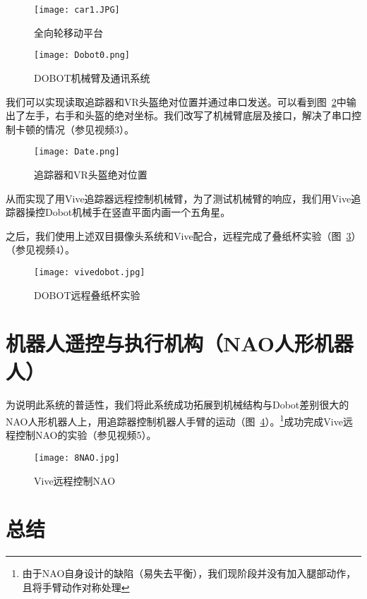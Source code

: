 \begin{figure}
\begin{minipage}{0.48\textwidth}
  \centering
  \texttt{[image: car1.JPG]}
  \caption{全向轮移动平台}
  \label{car1}
\end{minipage}
\begin{minipage}{0.48\textwidth}
  \centering
\texttt{[image: Dobot0.png]}
\caption{DOBOT机械臂及通讯系统} 
\label{sys}
\end{minipage}\hfill
\end{figure}


我们可以实现读取追踪器和VR头盔绝对位置并通过串口发送。可以看到图~\ref{POS}中输出了左手，右手和头盔的绝对坐标。我们改写了机械臂底层及接口，解决了串口控制卡顿的情况{\kaishu （参见视频3）}。

\begin{figure}[htbp]
\small
\centering
\texttt{[image: Date.png]}
\caption{追踪器和VR头盔绝对位置} 
\label{POS}
\end{figure}

从而实现了用Vive追踪器远程控制机械臂，为了测试机械臂的响应，我们用Vive追踪器操控Dobot机械手在竖直平面内画一个五角星。

之后，我们使用上述双目摄像头系统和Vive配合，远程完成了叠纸杯实验（图~\ref{cup}）{\kaishu （参见视频4）}。

\begin{figure}[htbp]
\small
\centering
\texttt{[image: vivedobot.jpg]}
\caption{DOBOT远程叠纸杯实验} 
\label{cup}
\end{figure}


\section{机器人遥控与执行机构（NAO人形机器人）}

为说明此系统的普适性，我们将此系统成功拓展到机械结构与Dobot差别很大的NAO人形机器人上，用追踪器控制机器人手臂的运动（图~\ref{8NAO}）。\footnote{由于NAO自身设计的缺陷（易失去平衡），我们现阶段并没有加入腿部动作，且将手臂动作对称处理}成功完成Vive远程控制NAO的实验{\kaishu （参见视频5）}。

\begin{figure}[htbp]
\small
\centering
\texttt{[image: 8NAO.jpg]}
\caption{Vive远程控制NAO} 
\label{8NAO}
\end{figure}


\section{总结}


